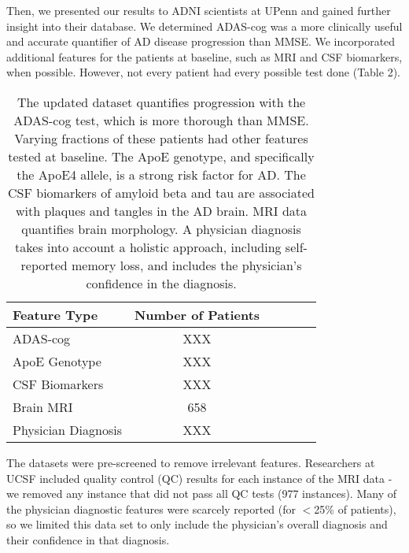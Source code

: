 \documentclass{article}
\begin{document}
Then, we presented our results to ADNI scientists at UPenn and gained further insight into their database. We determined ADAS-cog was a more clinically useful and accurate quantifier of AD disease progression than MMSE.  We incorporated additional features for the patients at baseline, such as MRI and CSF biomarkers, when possible. However, not every patient had every possible test done (Table 2). 

\begin{flushleft}
\begin{table}[h]
\caption{The updated dataset quantifies progression with the ADAS-cog test, which is more thorough than MMSE. Varying fractions of these patients had other features tested at baseline. The ApoE genotype, and specifically the ApoE4 allele, is a strong risk factor for AD. The CSF biomarkers of amyloid beta and tau are associated with plaques and tangles in the AD brain. MRI data quantifies brain morphology. A physician diagnosis takes into account a holistic approach, including self-reported memory loss, and includes the physician's confidence in the diagnosis.}
\label{sample-table}
\vskip 0.15in
\begin{center}
\begin{small}
\begin{sc}
\begin{tabular}{lccccr}
\hline
\abovespace
\belowspace
Feature Type & Number of Patients \\
\hline
\abovespace
\belowspace
ADAS-cog    & XXX \\
\belowspace
ApoE Genotype & XXX  \\
\belowspace
CSF Biomarkers    &  XXX  \\
\belowspace
Brain MRI    &  658 \\
\belowspace
Physician Diagnosis    &  XXX  \\

\hline
\end{tabular}
\end{sc}
\end{small}
\end{center}
\vskip -0.1in
\end{table}

\end{flushleft}

The datasets were pre-screened to remove irrelevant features. Researchers at UCSF included quality control (QC) results for each instance of the MRI data - we removed any instance that did not pass all QC tests (977 instances). Many of the physician diagnostic features were scarcely reported (for $<$25\% of patients), so we limited this data set to only include the physician's overall diagnosis and their confidence in that diagnosis.\\
\end{document}
